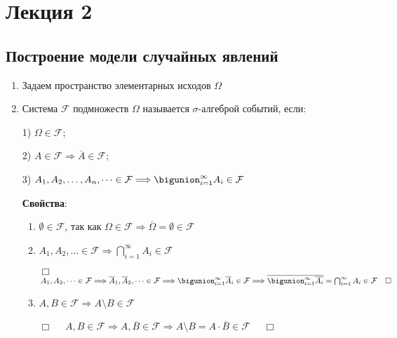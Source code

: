 \documentclass[12pt]{article}
\begin{document}
    \section{Лекция 2}
    
    \subsection{Построение модели случайных явлений}

    \hypertarget{axiomaticdefinitionofprobability}{}

    \begin{enumerate}
        \item Задаем пространство элементарных исходов $\Omega$

        \item \Defs Система $\mathcal{F}$ подмножеств $\Omega$ называется $\sigma$-алгеброй событий, если:

        1) $\Omega \in \mathcal{F}$;

        2) $A \in \mathcal{F} \Longrightarrow \overline{A} \in \mathcal{F}$;

        3) $A_1, A_2, \dots, A_n, \dots \in \mathcal{F} \Longrightarrow \bigunion_{i = 1}^\infty A_i \in \mathcal{F}$

        \textbf{Свойства}:

        \begin{enumerate}
            \item $\emptyset \in \mathcal{F}$, так как $\Omega \in \mathcal{F} \Longrightarrow \overline{\Omega} = \emptyset \in \mathcal{F}$

            \item $A_1, A_2, \dots \in \mathcal{F} \Longrightarrow \bigcap_{i = 1}^\infty A_i \in \mathcal{F}$

            \begin{tcolorbox}
                $\Box \quad$ $A_1, A_2, \dots \in \mathcal{F} \Longrightarrow
                \overline{A}_1, \overline{A}_2, \dots \in \mathcal{F} \Longrightarrow
                \bigunion_{i = 1}^\infty \overline{A}_i \in \mathcal{F} \Longrightarrow
                \overline{\bigunion_{i = 1}^\infty \overline{A_i}} = \bigcap_{i = 1}^\infty A_i \in \mathcal{F} \quad \Box$
            \end{tcolorbox}

            \item $A, B \in \mathcal{F} \Longrightarrow A \setminus B \in \mathcal{F}$

            \begin{tcolorbox}
                $\Box \quad$ $A, B \in \mathcal{F} \Longrightarrow A, \overline{B} \in \mathcal{F} \Longrightarrow A \setminus B = A \cdot \overline{B} \in \mathcal{F}$ $\quad \Box$
            \end{tcolorbox}


\end{enumerate}
\end{enumerate}
\end{document}
